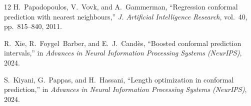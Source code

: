 \documentclass[11pt]{article}
\begin{document}
\begin{thebibliography}{12}
H.~Papadopoulos, V.~Vovk, and A.~Gammerman, ``Regression conformal prediction with nearest
neighbours,'' \emph{J. Artificial Intelligence Research}, vol.~40, pp.~815--840, 2011.

R.~Xie, R.~Foygel~Barber, and E.~J.~Cand\`es, ``Boosted conformal prediction intervals,'' in
\emph{Advances in Neural Information Processing Systems (NeurIPS)}, 2024.

S.~Kiyani, G.~Pappas, and H.~Hassani, ``Length optimization in conformal prediction,'' in
\emph{Advances in Neural Information Processing Systems (NeurIPS)}, 2024.

\end{thebibliography}
\end{document}
